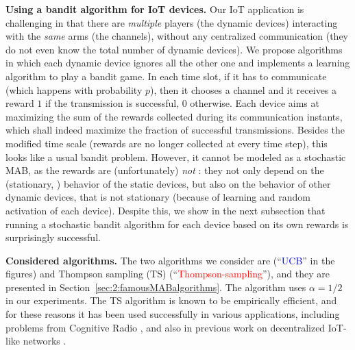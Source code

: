 \textbf{Using a bandit algorithm for IoT devices.}
%
Our IoT application is challenging in that there are \emph{multiple} players (the dynamic devices) interacting with the \emph{same} arms (the channels), without any centralized communication (they do not even know the total number of dynamic devices).
%
We propose algorithms in which each dynamic device ignores all the other one and
implements a learning algorithm to play a bandit game.
%
In each time slot, if it has to communicate (which happens with probability $p$), then it chooses a channel and it receives a reward $1$ if the transmission is successful, $0$ otherwise.
Each device aims at maximizing the sum of the rewards collected during its communication instants, which shall indeed maximize the fraction of successful transmissions. Besides the modified time scale (rewards are no longer collected at every time step), this looks like a usual bandit problem.
However, it cannot be modeled as a stochastic MAB, as the rewards are (unfortunately) \emph{not} \iid: they not only depend on the (stationary, \iid) behavior of the static devices, but also on the behavior of other dynamic devices, that is not stationary (because of learning and random activation of each device).
%
Despite this, we show in the next subsection that running a stochastic bandit algorithm for each device based on its own rewards is surprisingly successful.


\textbf{Considered algorithms.}
%
%
The two algorithms we consider are \UCB{} (``\textcolor{blue}{UCB}'' in the figures)
and Thompson sampling (TS) (``\textcolor{red}{Thompson-sampling}''),
and they are presented in Section~\ref{sec:2:famousMABalgorithms}.
%
The \UCB{} algorithm uses $\alpha = 1/2$ in our experiments.
The TS algorithm is known to be empirically efficient, and for these reasons it has been used successfully in various applications, including problems from Cognitive Radio \cite{Toldov16,Mitton16}, and also in previous work on decentralized IoT-like networks \cite{Darak16}.


